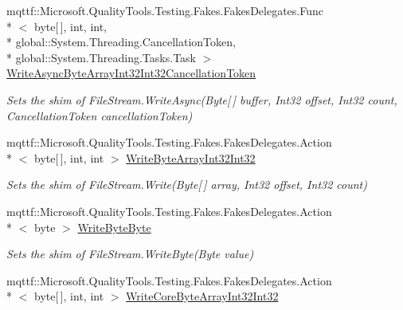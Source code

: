 \begin{DoxyCompactItemize}
mqttf\-::\-Microsoft.\-Quality\-Tools.\-Testing.\-Fakes.\-Fakes\-Delegates.\-Func\\*
$<$ byte\mbox{[}$\,$\mbox{]}, int, int, \\*
global\-::\-System.\-Threading.\-Cancellation\-Token, \\*
global\-::\-System.\-Threading.\-Tasks.\-Task $>$ \hyperlink{class_system_1_1_i_o_1_1_fakes_1_1_shim_file_stream_aa4b7fcf46f980b7ac162eb7ed428ff68}{Write\-Async\-Byte\-Array\-Int32\-Int32\-Cancellation\-Token}
\begin{DoxyCompactList}\small\item\em Sets the shim of File\-Stream.\-Write\-Async(\-Byte\mbox{[}$\,$\mbox{]} buffer, Int32 offset, Int32 count, Cancellation\-Token cancellation\-Token)\end{DoxyCompactList}\item 
mqttf\-::\-Microsoft.\-Quality\-Tools.\-Testing.\-Fakes.\-Fakes\-Delegates.\-Action\\*
$<$ byte\mbox{[}$\,$\mbox{]}, int, int $>$ \hyperlink{class_system_1_1_i_o_1_1_fakes_1_1_shim_file_stream_a8c20a9f46bca453c955f89905b096fbb}{Write\-Byte\-Array\-Int32\-Int32}
\begin{DoxyCompactList}\small\item\em Sets the shim of File\-Stream.\-Write(\-Byte\mbox{[}$\,$\mbox{]} array, Int32 offset, Int32 count)\end{DoxyCompactList}\item 
mqttf\-::\-Microsoft.\-Quality\-Tools.\-Testing.\-Fakes.\-Fakes\-Delegates.\-Action\\*
$<$ byte $>$ \hyperlink{class_system_1_1_i_o_1_1_fakes_1_1_shim_file_stream_a7a570ec99682947f57182afd631e3db0}{Write\-Byte\-Byte}
\begin{DoxyCompactList}\small\item\em Sets the shim of File\-Stream.\-Write\-Byte(\-Byte value)\end{DoxyCompactList}\item 
mqttf\-::\-Microsoft.\-Quality\-Tools.\-Testing.\-Fakes.\-Fakes\-Delegates.\-Action\\*
$<$ byte\mbox{[}$\,$\mbox{]}, int, int $>$ \hyperlink{class_system_1_1_i_o_1_1_fakes_1_1_shim_file_stream_ac8f3d0948ed7e5373f84c5d16442520a}{Write\-Core\-Byte\-Array\-Int32\-Int32}

\end{DoxyCompactItemize}
